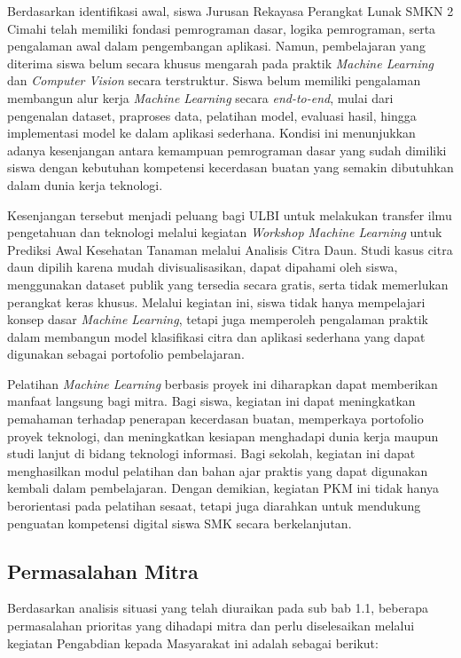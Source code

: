 Berdasarkan identifikasi awal, siswa Jurusan Rekayasa Perangkat Lunak SMKN 2 Cimahi telah memiliki fondasi pemrograman dasar, logika pemrograman, serta pengalaman awal dalam pengembangan aplikasi. Namun, pembelajaran yang diterima siswa belum secara khusus mengarah pada praktik \textit{Machine Learning} dan \textit{Computer Vision} secara terstruktur. Siswa belum memiliki pengalaman membangun alur kerja \textit{Machine Learning} secara \textit{end-to-end}, mulai dari pengenalan dataset, praproses data, pelatihan model, evaluasi hasil, hingga implementasi model ke dalam aplikasi sederhana. Kondisi ini menunjukkan adanya kesenjangan antara kemampuan pemrograman dasar yang sudah dimiliki siswa dengan kebutuhan kompetensi kecerdasan buatan yang semakin dibutuhkan dalam dunia kerja teknologi.

Kesenjangan tersebut menjadi peluang bagi ULBI untuk melakukan transfer ilmu pengetahuan dan teknologi melalui kegiatan \textit{Workshop Machine Learning} untuk Prediksi Awal Kesehatan Tanaman melalui Analisis Citra Daun. Studi kasus citra daun dipilih karena mudah divisualisasikan, dapat dipahami oleh siswa, menggunakan dataset publik yang tersedia secara gratis, serta tidak memerlukan perangkat keras khusus. Melalui kegiatan ini, siswa tidak hanya mempelajari konsep dasar \textit{Machine Learning}, tetapi juga memperoleh pengalaman praktik dalam membangun model klasifikasi citra dan aplikasi sederhana yang dapat digunakan sebagai portofolio pembelajaran.

Pelatihan \textit{Machine Learning} berbasis proyek ini diharapkan dapat memberikan manfaat langsung bagi mitra. Bagi siswa, kegiatan ini dapat meningkatkan pemahaman terhadap penerapan kecerdasan buatan, memperkaya portofolio proyek teknologi, dan meningkatkan kesiapan menghadapi dunia kerja maupun studi lanjut di bidang teknologi informasi. Bagi sekolah, kegiatan ini dapat menghasilkan modul pelatihan dan bahan ajar praktis yang dapat digunakan kembali dalam pembelajaran. Dengan demikian, kegiatan PKM ini tidak hanya berorientasi pada pelatihan sesaat, tetapi juga diarahkan untuk mendukung penguatan kompetensi digital siswa SMK secara berkelanjutan.

\subsection{Permasalahan Mitra}

Berdasarkan analisis situasi yang telah diuraikan pada sub bab 1.1, beberapa permasalahan prioritas yang dihadapi mitra dan perlu diselesaikan melalui kegiatan Pengabdian kepada Masyarakat ini adalah sebagai berikut:


